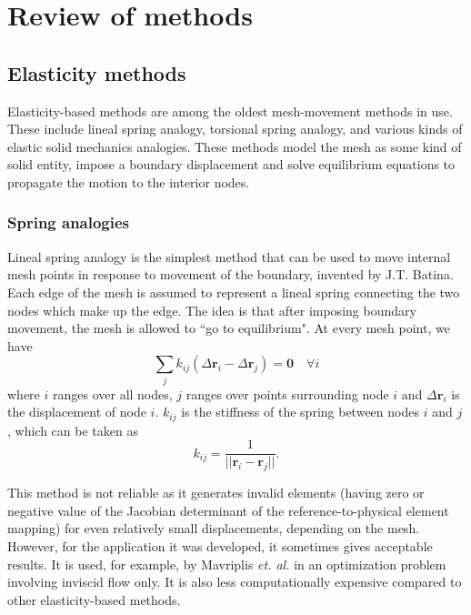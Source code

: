 \documentclass[letterpaper,11pt]{article}
\begin{document}
\section{Review of methods}

\subsection{Elasticity methods}
Elasticity-based methods are among the oldest mesh-movement methods in use. These include lineal spring analogy, torsional spring analogy, and various kinds of elastic solid mechanics analogies. These methods model the mesh as some kind of solid entity, impose a boundary displacement and solve equilibrium equations to propagate the motion to the interior nodes.

\subsubsection{Spring analogies}

Lineal spring analogy is the simplest method that can be used to move internal mesh points in response to movement of the boundary, invented by J.T. Batina. Each edge of the mesh is assumed to represent a lineal spring connecting the two nodes which make up the edge. The idea is that after imposing boundary movement, the mesh is allowed to ``go to equilibrium". At every mesh point, we have
\begin{equation}
\sum_j k_{ij}(\Delta \mathbf{r}_i - \Delta \mathbf{r}_j) = \mathbf{0} \quad \forall i
\end{equation}
where $i$ ranges over all nodes, $j$ ranges over points surrounding node $i$ and $\Delta \mathbf{r}_i$ is the displacement of node $i$.
$k_{ij}$ is the stiffness of the spring between nodes $i$ and $j$, which can be taken as
\begin{equation}
k_{ij} = \frac{1}{||\mathbf{r}_i - \mathbf{r}_j||}.
\end{equation}

This method is not reliable as it generates invalid elements (having zero or negative value of the Jacobian determinant of the reference-to-physical element mapping) for even relatively small displacements, depending on the mesh. However, for the application it was developed, it sometimes gives acceptable results. It is used, for example, by Mavriplis \emph{et. al.} \cite{appl:mavriplis} in an optimization problem involving inviscid flow only. It is also less computationally expensive compared to other elasticity-based methods.
\end{document}
